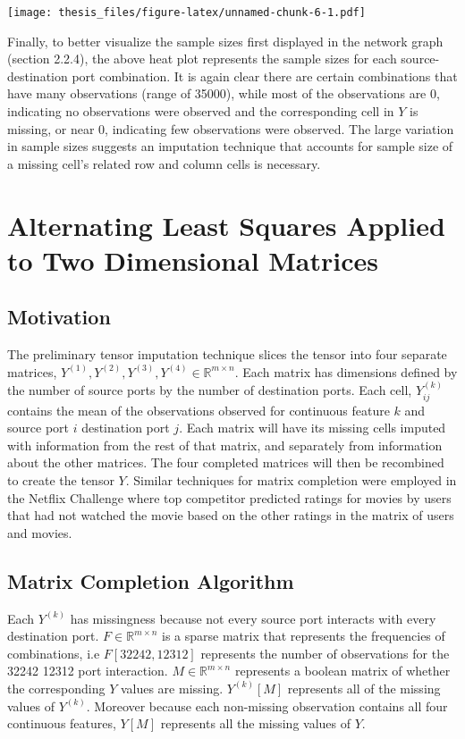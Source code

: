 \documentclass[12pt,twoside]{dukestatscithesis}
\theoremstyle{definition}
\theoremstyle{definition}
\theoremstyle{definition}
\theoremstyle{remark}
\begin{document}
\texttt{[image: thesis\_files/figure-latex/unnamed-chunk-6-1.pdf]}

Finally, to better visualize the sample sizes first displayed in the
network graph (section 2.2.4), the above heat plot represents the sample
sizes for each source-destination port combination. It is again clear
there are certain combinations that have many observations (range of
35000), while most of the observations are 0, indicating no observations
were observed and the corresponding cell in \(Y\) is missing, or near 0,
indicating few observations were observed. The large variation in sample
sizes suggests an imputation technique that accounts for sample size of
a missing cell's related row and column cells is necessary.

\chapter{Alternating Least Squares Applied to Two Dimensional
Matrices}\label{alternating-least-squares-applied-to-two-dimensional-matrices}

\section{Motivation}\label{motivation-1}

The preliminary tensor imputation technique slices the tensor into four
separate matrices,
\(Y^{(1)}, Y^{(2)}, Y^{(3)}, Y^{(4)} \in \mathbb{R}^{m \times n}\). Each
matrix has dimensions defined by the number of source ports by the
number of destination ports. Each cell, \(Y^{(k)}_{ij}\) contains the
mean of the observations observed for continuous feature \(k\) and
source port \(i\) destination port \(j\). Each matrix will have its
missing cells imputed with information from the rest of that matrix, and
separately from information about the other matrices. The four completed
matrices will then be recombined to create the tensor \(Y\). Similar
techniques for matrix completion were employed in the Netflix Challenge
where top competitor predicted ratings for movies by users that had not
watched the movie based on the other ratings in the matrix of users and
movies.

\section{Matrix Completion Algorithm}\label{matrix-completion-algorithm}

Each \(Y^{(k)}\) has missingness because not every source port interacts
with every destination port. \(F \in \mathbb{R}^{m \times n}\) is a
sparse matrix that represents the frequencies of combinations, i.e
\(F[32242,12312]\) represents the number of observations for the 32242
12312 port interaction. \(M \in \mathbb{R}^{m \times n}\) represents a
boolean matrix of whether the corresponding \(Y\) values are missing.
\(Y^{(k)}[M]\) represents all of the missing values of \(Y^{(k)}\).
Moreover because each non-missing observation contains all four
continuous features, \(Y[M]\) represents all the missing values of
\(Y\).
\end{document}
